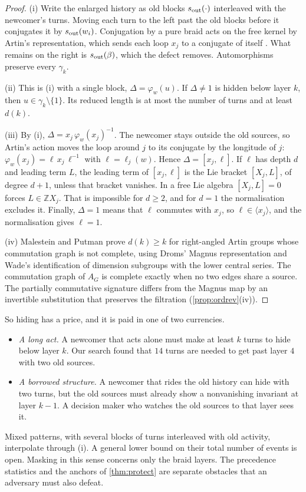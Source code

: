 \documentclass[11pt]{article}
\theoremstyle{definition}\newtheorem{definition}[theorem]{Definition}\newtheorem{remark}[theorem]{Remark}\newtheorem{example}[theorem]{Example}\newtheorem{problem}[theorem]{Open problem}\crefname{problem}{Problem}{Problems}
\begin{document}
\begin{proof}
(i) Write the enlarged history as old blocks $s_{\rm out}(\cdot)$ interleaved with the newcomer's turns. Moving each turn to the left past the old blocks before it conjugates it by $s_{\rm out}(w_i)$. Conjugation by a pure braid acts on the free kernel by Artin's representation, which sends each loop $x_j$ to a conjugate of itself \cite{Artin1947,Birman1974}. What remains on the right is $s_{\rm out}(\beta)$, which the defect removes. Automorphisms preserve every $\gamma_k$.

(ii) This is (i) with a single block, $\Delta=\varphi_w(u)$. If $\Delta\ne1$ is hidden below layer $k$, then $u\in\gamma_k\setminus\{1\}$. Its reduced length is at most the number of turns and at least $d(k)$.

(iii) By (i), $\Delta=x_j\,\varphi_w(x_j)^{-1}$. The newcomer stays outside the old sources, so Artin's action moves the loop around $j$ to its conjugate by the longitude of $j$: $\varphi_w(x_j)=\ell\,x_j\,\ell^{-1}$ with $\ell=\ell_j(w)$. Hence $\Delta=[x_j,\ell]$. If $\ell$ has depth $d$ and leading term $L$, the leading term of $[x_j,\ell]$ is the Lie bracket $[X_j,L]$, of degree $d+1$, unless that bracket vanishes. In a free Lie algebra $[X_j,L]=0$ forces $L\in\mathbb ZX_j$. That is impossible for $d\ge2$, and for $d=1$ the normalisation excludes it. Finally, $\Delta=1$ means that $\ell$ commutes with $x_j$, so $\ell\in\langle x_j\rangle$, and the normalisation gives $\ell=1$.

(iv) Malestein and Putman prove $d(k)\ge k$ for right-angled Artin groups whose commutation graph is not complete, using Droms' Magnus representation and Wade's identification of dimension subgroups with the lower central series. The commutation graph of $A_G$ is complete exactly when no two edges share a source. The partially commutative signature differs from the Magnus map by an invertible substitution that preserves the filtration (\cref{prop:ordrev}(iv)).
\end{proof}

So hiding has a price, and it is paid in one of two currencies.
\begin{itemize}
\item \emph{A long act.} A newcomer that acts alone must make at least $k$ turns to hide below layer $k$. Our search found that $14$ turns are needed to get past layer $4$ with two old sources.
\item \emph{A borrowed structure.} A newcomer that rides the old history can hide with two turns, but the old sources must already show a nonvanishing invariant at layer $k-1$. A decision maker who watches the old sources to that layer sees it.
\end{itemize}
Mixed patterns, with several blocks of turns interleaved with old activity, interpolate through (i). A general lower bound on their total number of events is open. Masking in this sense concerns only the braid layers. The precedence statistics and the anchors of \cref{thm:protect} are separate obstacles that an adversary must also defeat.
\end{document}

